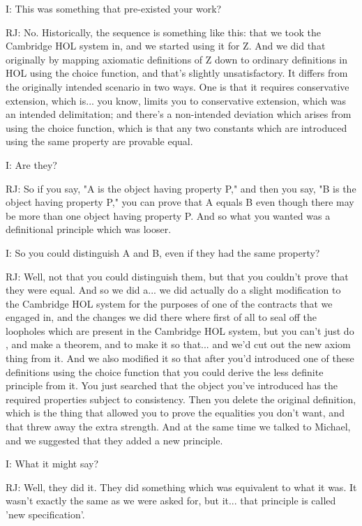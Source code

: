 \documentclass[10pt,titlepage]{book}
\begin{document}
I: This was something that pre-existed your work?

RJ: No. Historically, the sequence is something like this: that we took the Cambridge HOL system in, and we started using it for Z. And we did that originally by mapping axiomatic definitions of Z down to ordinary definitions in HOL using the choice function, and that's slightly unsatisfactory. It differs from the originally intended scenario in two ways. One is that it requires conservative extension, which is... you know, limits you to conservative extension, which was an intended delimitation; and there's a non-intended deviation which arises from using the choice function, which is that any two constants which are introduced using the same property are provable equal.

I: Are they?

RJ: So if you say, "A is the object having property P," and then you say, "B is the object having property P," you can prove that A equals B even though there may be more than one object having property P. And so what you wanted was a definitional principle which was looser.

I: So you could distinguish A and B, even if they had the same property?

RJ: Well, not that you could distinguish them, but that you couldn't prove that they were equal. And so we did a... we did actually do a slight modification to the Cambridge HOL system for the purposes of one of the contracts that we engaged in, and the changes we did there where first of all to seal off the loopholes which are present in the Cambridge HOL system, but you can't just do 	, and make a theorem, and to make it so that... and we'd cut out the new axiom thing from it. And we also modified it so that after you'd introduced one of these definitions using the choice function that you could derive the less definite principle from it. You just searched that the object you've introduced has the required properties subject to consistency. Then you delete the original definition, which is the thing that allowed you to prove the equalities you don't want, and that threw away the extra strength. And at the same time we talked to Michael, and we suggested that they added a new principle.

I: What it might say?

RJ: Well, they did it. They did something which was equivalent to what it was. It wasn't exactly the same as we were asked for, but it... that principle is called 'new specification'.
\end{document}
